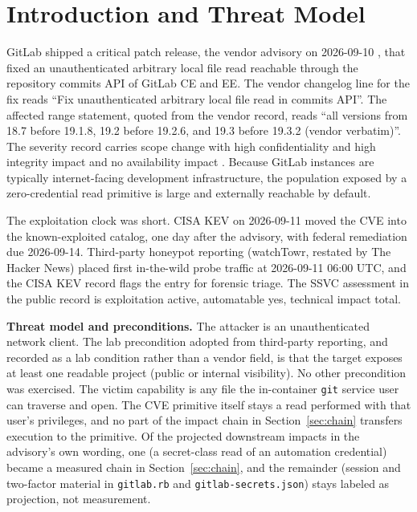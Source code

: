 \documentclass[journal]{IEEEtran}
\begin{document}
\section{Introduction and Threat Model}
\label{sec:intro}

GitLab shipped a critical patch release, the vendor advisory on 2026-09-10
\cite{advisory},
that fixed an unauthenticated arbitrary local file read reachable through the
repository commits API of GitLab CE and EE. The vendor changelog line for the
fix reads ``Fix unauthenticated arbitrary local file read in commits API''.
The affected range statement, quoted from the vendor record, reads
``all versions from 18.7 before 19.1.8, 19.2 before 19.2.6, and 19.3 before 19.3.2 (vendor verbatim)''.
The severity record carries scope change with high confidentiality and high
integrity impact and no availability impact \cite{cve}. Because GitLab
instances are
typically internet-facing development infrastructure, the population exposed
by a zero-credential read primitive is large and externally reachable by
default.

The exploitation clock was short. CISA KEV on 2026-09-11
\cite{kev} moved the CVE into
the known-exploited catalog, one day after the advisory, with federal
remediation due 2026-09-14.
Third-party honeypot reporting (watchTowr, restated by The Hacker News)
\cite{wt} placed
first in-the-wild probe traffic at 2026-09-11 06:00 UTC, and the CISA KEV
record flags the entry for forensic triage. The SSVC assessment in the public
record is exploitation active, automatable yes, technical impact total.

\textbf{Threat model and preconditions.} The attacker is an unauthenticated
network client. The lab precondition adopted from third-party reporting, and
recorded as a lab condition rather than a vendor field, is that the target
exposes at least one readable project (public or internal visibility). No
other precondition was exercised. The victim capability is any file the
in-container \texttt{git} service user can traverse and open. The CVE
primitive itself stays a read performed with that user's privileges, and no
part of the impact chain in Section~\ref{sec:chain} transfers execution to the
primitive. Of the projected downstream impacts in the advisory's own wording,
one (a secret-class read of an automation credential) became a measured chain
in Section~\ref{sec:chain}, and the remainder (session and two-factor material
in \texttt{gitlab.rb} and \texttt{gitlab-secrets.json}) stays labeled as
projection, not measurement.
\end{document}
